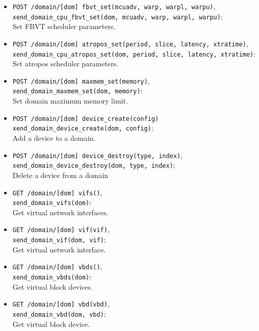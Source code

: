\documentclass[11pt,twoside,final,openright]{xenstyle}
\begin{document}
\begin{itemize}
\item {\tt POST /domain/[dom] fbvt\_set(mcuadv, warp, warpl, warpu)},\\
  {\tt xend\_domain\_cpu\_fbvt\_set(dom, mcuadv, warp, warpl, warpu)}:\\
  Set FBVT scheduler parameters.

\item {\tt POST /domain/[dom] atropos\_set(period, slice, latency, xtratime)},\\
  {\tt xend\_domain\_cpu\_atropos\_set(dom, period, slice, latency, xtratime)}:\\
  Set atropos scheduler parameters.

\item {\tt POST /domain/[dom] maxmem\_set(memory)},\\
  {\tt xend\_domain\_maxmem\_set(dom, memory)}:\\
  Set domain maximum memory limit.

\item {\tt POST /domain/[dom] device\_create(config)}\\
  {\tt xend\_domain\_device\_create(dom, config)}:\\
  Add a device to a domain.

\item {\tt POST /domain/[dom] device\_destroy(type, index)},\\
  {\tt xend\_domain\_device\_destroy(dom, type, index)}:\\
  Delete a device from a domain

\item {\tt GET /domain/[dom] vifs()},\\
  {\tt xend\_domain\_vifs(dom)}:\\
  Get virtual network interfaces.

\item {\tt GET /domain/[dom] vif(vif)},\\
  {\tt xend\_domain\_vif(dom, vif)}:\\
  Get virtual network interface.

\item {\tt GET /domain/[dom] vbds()},\\
  {\tt xend\_domain\_vbds(dom)}:\\
  Get virtual block devices.

\item {\tt GET /domain/[dom] vbd(vbd)},\\
  {\tt xend\_domain\_vbd(dom, vbd)}:\\
  Get virtual block device.


\end{itemize}
\end{document}
